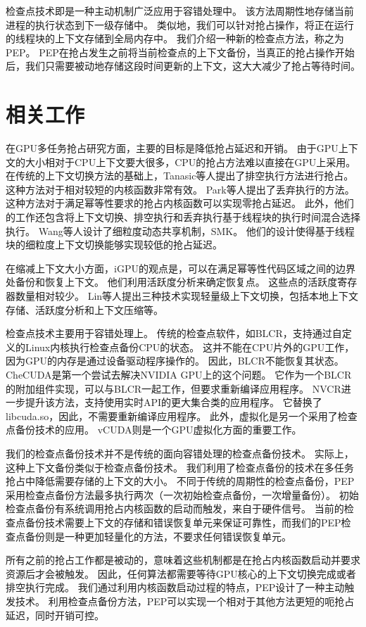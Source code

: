 检查点技术即是一种主动机制广泛应用于容错处理中。
该方法周期性地存储当前进程的执行状态到下一级存储中。
类似地，我们可以针对抢占操作，将正在运行的线程块的上下文存储到全局内存中。
我们介绍一种新的检查点方法，称之为PEP。
PEP在抢占发生之前将当前检查点的上下文备份，当真正的抢占操作开始后，我们只需要被动地存储这段时间更新的上下文，这大大减少了抢占等待时间。

\section{相关工作}

在GPU多任务抢占研究方面，主要的目标是降低抢占延迟和开销。
由于GPU上下文的大小相对于CPU上下文要大很多，CPU的抢占方法难以直接在GPU上采用。
在传统的上下文切换方法的基础上，Tanasic等人提出了排空执行方法进行抢占。
这种方法对于相对较短的内核函数非常有效。
Park等人提出了丢弃执行的方法。
这种方法对于满足幂等性要求的抢占内核函数可以实现零抢占延迟。
此外，他们的工作还包含将上下文切换、排空执行和丢弃执行基于线程块的执行时间混合选择执行。
Wang等人设计了细粒度动态共享机制，SMK。
他们的设计使得基于线程块的细粒度上下文切换能够实现较低的抢占延迟。

在缩减上下文大小方面，iGPU的观点是，可以在满足幂等性代码区域之间的边界处备份和恢复上下文。 
他们利用活跃度分析来确定恢复点。
这些点的活跃度寄存器数量相对较少。
Lin等人提出三种技术实现轻量级上下文切换，包括本地上下文存储、活跃度分析和上下文压缩等。

检查点技术主要用于容错处理上。
传统的检查点软件，如BLCR，支持通过自定义的Linux内核执行检查点备份CPU的状态。
这并不能在CPU片外的GPU工作，因为GPU的内存是通过设备驱动程序操作的。
因此，BLCR不能恢复其状态。
CheCUDA是第一个尝试去解决NVIDIA GPU上的这个问题。
它作为一个BLCR的附加组件实现，可以与BLCR一起工作，但要求重新编译应用程序。
NVCR进一步提升该方法，支持使用实时API的更大集合类的应用程序。
它替换了libcuda.so，因此，不需要重新编译应用程序。
此外，虚拟化是另一个采用了检查点备份技术的应用。
vCUDA则是一个GPU虚拟化方面的重要工作。

我们的检查点备份技术并不是传统的面向容错处理的检查点备份技术。
实际上，这种上下文备份类似于检查点备份技术。
我们利用了检查点备份的技术在多任务抢占中降低需要存储的上下文的大小。
不同于传统的周期性的检查点备份，PEP采用检查点备份方法最多执行两次（一次初始检查点备份，一次增量备份）。
初始检查点备份有系统调用抢占内核函数的启动而触发，来自于硬件信号。
当前的检查点备份技术需要上下文的存储和错误恢复单元来保证可靠性，而我们的PEP检查点备份则是一种更加轻量化的方法，不要求任何错误恢复单元。

所有之前的抢占工作都是被动的，意味着这些机制都是在抢占内核函数启动并要求资源后才会被触发。
因此，任何算法都需要等待GPU核心的上下文切换完成或者排空执行完成。
我们通过利用内核函数启动过程的特点，PEP设计了一种主动触发技术。
利用检查点备份方法，PEP可以实现一个相对于其他方法更短的呃抢占延迟，同时开销可控。


